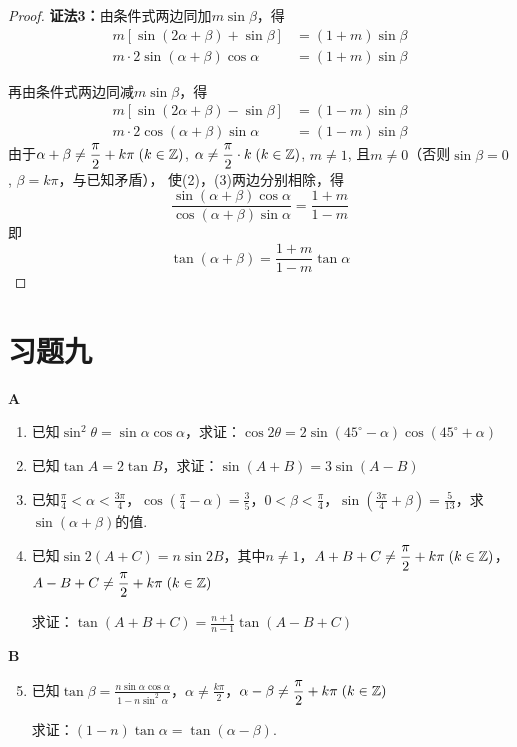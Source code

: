 \begin{proof}
\textbf{证法3：}由条件式两边同加$m\sin\beta$，得
\begin{align}
    m[\sin(2\alpha+\beta)+\sin\beta]&=(1+m)\sin\beta \nonumber\\
    m\cdot 2\sin(\alpha+\beta)\cos\alpha&=(1+m)\sin\beta \tag{2}
\end{align}

再由条件式两边同减$m\sin\beta$，得
\begin{align}
    m[\sin(2\alpha+\beta)-\sin\beta]&=(1-m)\sin\beta \nonumber\\
    m\cdot 2\cos(\alpha+\beta)\sin\alpha&=(1-m)\sin\beta \tag{3}
\end{align}
由于$\alpha+\beta\ne \dfrac{\pi}{2}+k\pi\; (k\in\mathbb{Z})$, $\alpha\ne \dfrac{\pi}{2}\cdot k\; (k\in\mathbb{Z})$, $m\ne 1$, 且$m\ne 0$（否则$\sin\beta=0$, $\beta=k\pi$，与已知矛盾），
使(2)，(3)两边分别相除，得    
\[\frac{\sin(\alpha+\beta)\cos\alpha}{\cos(\alpha+\beta)\sin\alpha}=\frac{1+m}{1-m}\]
即\[\tan(\alpha+\beta)=\frac{1+m}{1-m}\tan\alpha\]
\end{proof}

\section*{习题九}
\begin{center}
    \bfseries A
\end{center}

\begin{enumerate}
    \item 已知$\sin^2\theta=\sin\alpha\cos\alpha$，求证：$\cos2\theta=2\sin(45^{\circ}-\alpha)\cos(45^{\circ}+\alpha)$
\item 已知$\tan A=2\tan B$，求证：$\sin(A+B)=3\sin (A-B)$
\item 已知$\frac{\pi}{4}<\alpha<\frac{3\pi}{4}$，$\cos\left(\frac{\pi}{4}-\alpha\right)=\frac{3}{5}$，$0<\beta<\frac{\pi}{4}$，$\sin\left(\frac{3\pi}{4}+\beta\right)=\frac{5}{13}$，求$\sin(\alpha+\beta)$的值.
\item 已知$\sin2(A+C)=n\sin 2B$，其中$n\ne1$，$A+B+C\ne \dfrac{\pi}{2}+k\pi\; (k\in\mathbb{Z})$，$A-B+C\ne \dfrac{\pi}{2}+k\pi\; (k\in\mathbb{Z})$

求证：$\tan(A+B+C)=\frac{n+1}{n-1}\tan(A-B+C)$
\end{enumerate}

\begin{center}
    \bfseries B
\end{center}

\begin{enumerate}\setcounter{enumi}{4}
    \item 已知$\tan\beta=\frac{n\sin\alpha\cos\alpha}{1-n\sin^2\alpha}$，$\alpha\ne \frac{k\pi}{2}$，$\alpha-\beta\ne \dfrac{\pi}{2}+k\pi\; (k\in\mathbb{Z})$
    
    求证：$(1-n)\tan \alpha=\tan(\alpha-\beta)$.
\end{enumerate}

